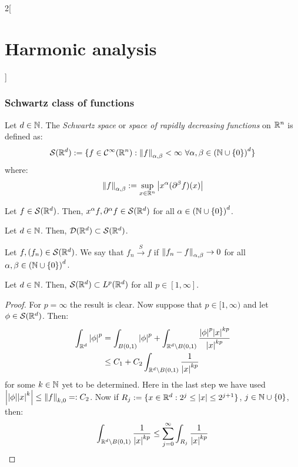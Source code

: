 \documentclass[../../../main_math.tex]{subfiles}
\begin{document}
\begin{multicols}{2}[\section{Harmonic analysis}]
  \subsubsection{Schwartz class of functions}
  \begin{definition}
    Let $d\in\mathbb{N}$. The \emph{Schwartz space} or \emph{space of rapidly decreasing functions} on $\mathbb{R}^n$ is defined as:
    $$
      \mathcal{S}(\RR^d):=\{f\in \mathcal{C}^\infty(\RR^n):\norm{f}_{\alpha,\beta}<\infty\ \forall\alpha,\beta\in{(\NN\cup\{0\})}^d\}
    $$
    where:
    $$
      \left\|f\right\|_{\alpha,\beta}:=\sup_{x\in\mathbb{R}^n}\abs{x^\alpha (\partial^\beta f)(x)}
    $$
  \end{definition}
  \begin{lemma}
    Let $f\in \mathcal{S}(\mathbb{R}^d)$. Then, $x^\alpha f,\partial^\alpha f\in \mathcal{S}(\mathbb{R}^d)$ for all $\alpha\in{(\ensuremath{\mathbb{N}}\cup\{0\})}^d$.
  \end{lemma}
  \begin{lemma}
    Let $d\in\mathbb{N}$. Then, $\mathcal{D}(\mathbb{R}^d)\subset\mathcal{S}(\mathbb{R}^d)$.
  \end{lemma}
  \begin{definition}
    Let $f,(f_n)\in \mathcal{S}(\mathbb{R}^d)$. We say that $f_n\overset{S}{\longrightarrow}f$ if $\left\|f_n-f\right\|_{\alpha,\beta}\to 0$ for all $\alpha,\beta\in{(\ensuremath{\mathbb{N}}\cup\{0\})}^d$.
  \end{definition}
  \begin{proposition}
    Let $d\in\mathbb{N}$. Then, $\mathcal{S}(\mathbb{R}^d)\subset L^p(\mathbb{R}^d)$ for all $p\in[1,\infty]$.
  \end{proposition}
  \begin{proof}
    For $p=\infty$ the result is clear. Now suppose that $p\in[1,\infty)$ and let $\phi\in \mathcal{S}(\mathbb{R}^d)$. Then:
    \begin{align*}
      \int_{\mathbb{R}^d}\abs{\phi}^p & = \int_{B(0,1)}\abs{\phi}^p+\int_{\mathbb{R}^d\setminus B(0,1)}\frac{\abs{\phi}^p\abs{x}^{kp}}{\abs{x}^{kp}} \\
                               & \leq C_1+C_2\int_{\mathbb{R}^d\setminus B(0,1)}\frac{1}{\abs{x}^{kp}}
    \end{align*}
    for some $k\in \mathbb{N}$ yet to be determined. Here in the last step we have used $\abs{\abs{\phi}\abs{x}^{k}}\leq \left\|f\right\|_{k,0}=:C_2$. Now if $R_j:=\{x\in\mathbb{R}^d:2^j\leq \abs{x}\leq 2^{j+1}\}$, $j\in\mathbb{N}\cup\{0\}$, then:
    \begin{align*}
      \int_{\RR^d\setminus B(0,1)}\frac{1}{\abs{x}^{kp}} & \leq \sum_{j=0}^\infty \int_{R_j}\frac{1}{\abs{x}^{kp}} \\

\end{align*}
\end{proof}
\end{multicols}
\end{document}
